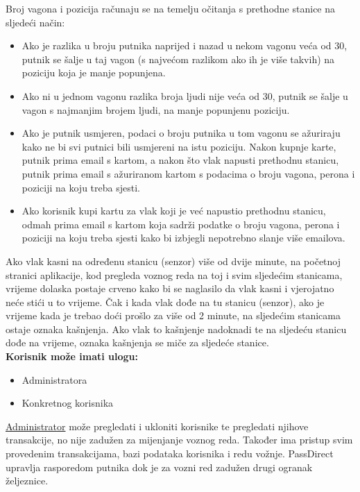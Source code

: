 Broj vagona i pozicija računaju se na temelju očitanja s prethodne stanice na sljedeći način: 
\begin{itemize}
\item Ako je razlika u broju putnika naprijed i nazad u nekom vagonu veća od 30, putnik se šalje u taj vagon (s najvećom razlikom ako ih je više takvih) na poziciju koja je manje popunjena. 
\item Ako ni u jednom vagonu razlika broja ljudi nije veća od 30, putnik se šalje u vagon s najmanjim brojem ljudi, na manje popunjenu poziciju. 
\item Ako je putnik usmjeren, podaci o broju putnika u tom vagonu se ažuriraju kako ne bi svi putnici bili usmjereni na istu poziciju.
Nakon kupnje karte, putnik prima email s kartom, a nakon što vlak napusti prethodnu stanicu, putnik prima email s ažuriranom kartom s podacima o broju vagona, perona i poziciji na koju treba sjesti. 
\item Ako korisnik kupi kartu za vlak koji je već napustio prethodnu stanicu, odmah prima email s kartom koja sadrži podatke o broju vagona, perona i poziciji na koju treba sjesti kako bi izbjegli nepotrebno slanje više emailova.\\
\end{itemize}
Ako vlak kasni na određenu stanicu (senzor) više od dvije minute, na početnoj stranici aplikacije, kod pregleda voznog reda na toj i svim sljedećim stanicama, vrijeme dolaska postaje crveno kako bi se naglasilo da vlak kasni i vjerojatno neće stići u to vrijeme. Čak i kada vlak dođe na tu stanicu (senzor), ako je vrijeme kada je trebao doći prošlo za više od 2 minute, na sljedećim stanicama ostaje oznaka kašnjenja. Ako vlak to kašnjenje nadoknadi te na sljedeću stanicu dođe na vrijeme, oznaka kašnjenja se miče za sljedeće stanice.\\

    \textbf{Korisnik može imati ulogu:}
    \begin{itemize}
    \item Administratora 
    \item Konkretnog korisnika\\
    \end{itemize}
    
    \underline{Administrator} može pregledati i ukloniti korisnike te pregledati njihove transakcije, no nije zadužen za mijenjanje voznog reda. Također ima pristup svim provedenim transakcijama, bazi podataka korisnika i redu vožnje. PassDirect upravlja rasporedom putnika dok je za vozni red zadužen drugi ogranak željeznice. \\
    
